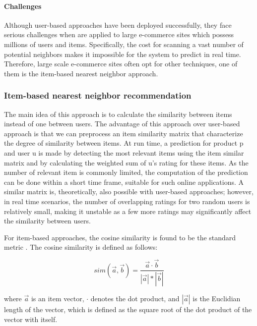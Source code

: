 \paragraph{Challenges}
Although user-based approaches have been deployed successfully, they face serious challenges when are applied to large e-commerce sites which possess millions of users and items. Specifically, the cost for scanning a vast number of potential neighbors makes it impossible for the system to predict in real time. Therefore, large scale e-commerce sites often opt for other techniques, one of them is the item-based nearest neighbor approach.

\subsubsection{Item-based nearest neighbor recommendation}
The main idea of this approach is to calculate the similarity between items instead of one between users. The advantage of this approach over user-based approach is that we can preprocess an item similarity matrix that characterize the degree of similarity between items. At run time, a prediction for product p and user u is made by detecting the most relevant items using the item similar matrix and by calculating the weighted sum of u's rating for these items. As the number of relevant item is commonly limited, the computation of the prediction can be done within a short time frame, suitable for such online applications. A similar matrix is, theoretically, also possible with user-based approaches; however, in real time scenarios, the number of overlapping ratings for two random users is relatively small, making it unstable as a few more ratings may significantly affect the similarity between users.

For item-based approaches, the cosine similarity is found to be the standard metric \cite{jannach2010recommender}. The cosine similarity is defined as follows:

\begin{displaymath}
sim(\overrightarrow{a}, \overrightarrow{b}) = \frac{\overrightarrow{a} \cdot \overrightarrow{b}}{|\overrightarrow{a}| * | \overrightarrow{b} |}
\end{displaymath}

where \( \overrightarrow{a} \) is an item vector, \( \cdot \) denotes the dot product, and \(|\overrightarrow{a}| \) is the Euclidian length of the vector, which is defined as the square root of the dot product of the vector with itself. 

